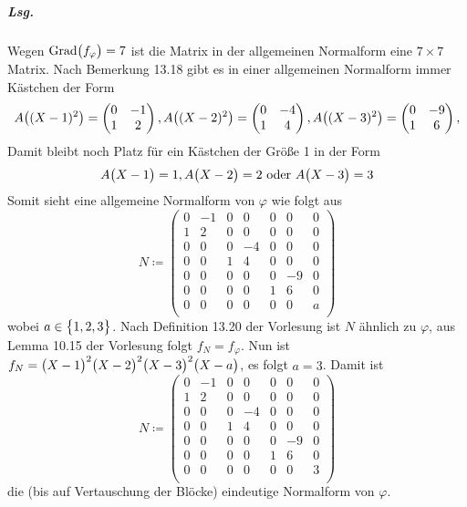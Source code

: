\documentclass{scrreprt}
\newcommand{\Grad}{\text{Grad}}
\begin{document}
\begin{enumerate}[(i)]
  \subparagraph{Lsg.} Wegen $\Grad\qty\big(f_{\varphi}) = 7$ ist die Matrix in
  der allgemeinen Normalform eine $7 \times 7$ Matrix.
  Nach Bemerkung 13.18 gibt es in einer allgemeinen Normalform immer Kästchen der
  Form
  \[
    A\qty\big((X - 1)^2) = \begin{pmatrix}
      0 & -1 \\
      1 & 2 \\
    \end{pmatrix}, A\qty\big((X - 2)^2) = \begin{pmatrix}
      0 & -4 \\
      1 & 4 \\
    \end{pmatrix}, A\qty\big((X - 3)^2) = \begin{pmatrix}
      0 & -9 \\
      1 & 6 \\
    \end{pmatrix},
  \]
  Damit bleibt noch Platz für ein Kästchen der Größe 1 in der Form
  \[
    A\qty\big(X - 1) = 1, A\qty\big(X - 2) = 2 \text{ oder }
    A\qty\big(X - 3) = 3
  \]
  Somit sieht eine allgemeine Normalform von $\varphi$ wie folgt aus
  \[
    N \coloneqq \begin{pmatrix}
      0 & -1 & 0 &  0 & 0 &  0 & 0 \\
      1 &  2 & 0 &  0 & 0 &  0 & 0 \\
      0 &  0 & 0 & -4 & 0 &  0 & 0 \\
      0 &  0 & 1 &  4 & 0 &  0 & 0 \\
      0 &  0 & 0 &  0 & 0 & -9 & 0 \\
      0 &  0 & 0 &  0 & 1 &  6 & 0 \\
      0 &  0 & 0 &  0 & 0 &  0 & a \\
    \end{pmatrix}
  \]
  wobei $a \in \qty\big{1, 2, 3}$.
  Nach Definition 13.20 der Vorlesung ist $N$ ähnlich zu $\varphi$,
  aus Lemma 10.15 der Vorlesung folgt $f_N = f_{\varphi}$.
  Nun ist
  $f_N = \qty\big(X - 1)^2 \qty\big(X - 2)^2\qty\big(X - 3)^2\qty\big(X - a)$,
  es folgt $a = 3$.
  Damit ist
  \[
    N \coloneqq \begin{pmatrix}
      0 & -1 & 0 &  0 & 0 &  0 & 0 \\
      1 &  2 & 0 &  0 & 0 &  0 & 0 \\
      0 &  0 & 0 & -4 & 0 &  0 & 0 \\
      0 &  0 & 1 &  4 & 0 &  0 & 0 \\
      0 &  0 & 0 &  0 & 0 & -9 & 0 \\
      0 &  0 & 0 &  0 & 1 &  6 & 0 \\
      0 &  0 & 0 &  0 & 0 &  0 & 3 \\
    \end{pmatrix}
  \]
  die (bis auf Vertauschung der Blöcke) eindeutige Normalform von $\varphi$.


\end{enumerate}
\end{document}

